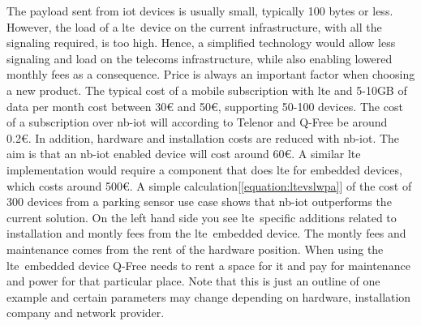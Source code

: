 \documentclass[USenglish]{ifimaster}  %
\begin{document}
The payload sent from \acrshort{iot} devices is usually small, typically 100 bytes or less. However, the load of a \acrshort{lte} device on the current infrastructure, with all the signaling required, is too high. Hence, a simplified technology would allow less signaling and load on the telecoms infrastructure, while also enabling lowered monthly fees as a consequence. Price is always an important factor when choosing a new product. The typical cost of a mobile subscription with \acrshort{lte} and 5-10GB of data per month cost between 30€ and 50€, supporting 50-100 devices. The cost of a subscription over \acrshort{nb-iot} will according to Telenor and Q-Free be around 0.2€. In addition, hardware and installation costs are reduced with \acrshort{nb-iot}. The aim is that an \acrshort{nb-iot} enabled device will cost around 60€. A similar \acrshort{lte} implementation would require a component that does \acrshort{lte} for embedded devices, which costs around 500€. A simple calculation[\ref{equation:ltevslwpa}] of the cost of 300 devices from a parking sensor use case shows that \acrshort{nb-iot} outperforms the current solution. On the left hand side you see \acrshort{lte} specific additions related to installation and montly fees from the \acrshort{lte} embedded device. The montly fees and maintenance comes from the rent of the hardware position. When using the \acrshort{lte} embedded device Q-Free needs to rent a space for it and pay for maintenance and power for that particular place. Note that this is just an outline of one example and certain parameters may change depending on hardware, installation company and network provider.
\end{document}
